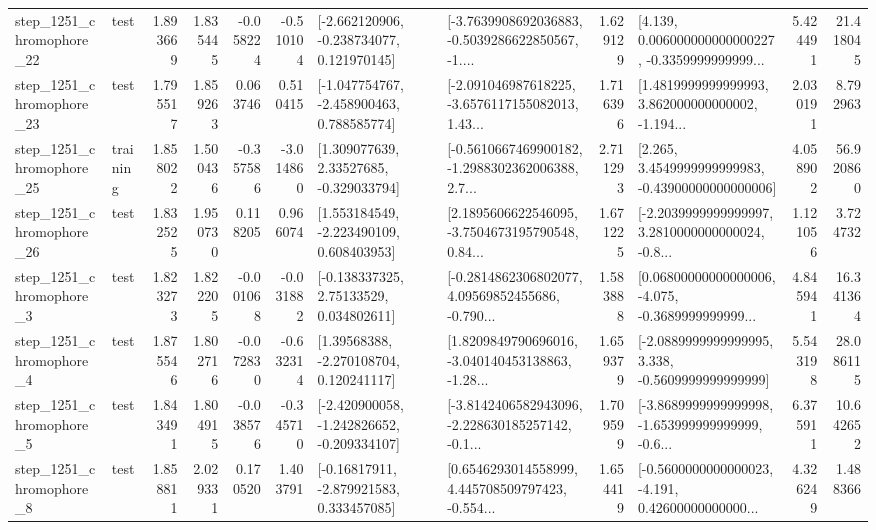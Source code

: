 \begin{tabular}{llrrrrllrlrr}
 step\_1251\_chromophore\_22 &      test &      1.893669 &    1.835445 &     -0.058224 & -0.510104 &   [-2.662120906, -0.238734077, 0.121970145] &  [-3.7639908692036883, -0.5039286622850567, -1.... &       1.629129 &  [4.139, 0.006000000000000227, -0.3359999999999... &            5.424491 &         21.418045 \\
 step\_1251\_chromophore\_23 &      test &      1.795517 &    1.859263 &      0.063746 &  0.510415 &   [-1.047754767, -2.458900463, 0.788585774] &  [-2.091046987618225, -3.6576117155082013, 1.43... &       1.716396 &  [1.4819999999999993, 3.862000000000002, -1.194... &            2.030191 &          8.792963 \\
 step\_1251\_chromophore\_25 &  training &      1.858022 &    1.500436 &     -0.357586 & -3.014860 &     [1.309077639, 2.33527685, -0.329033794] &  [-0.5610667469900182, -1.2988302362006388, 2.7... &       2.711293 &  [2.265, 3.4549999999999983, -0.43900000000000006] &            4.058902 &         56.920860 \\
 step\_1251\_chromophore\_26 &      test &      1.832525 &    1.950730 &      0.118205 &  0.966074 &    [1.553184549, -2.223490109, 0.608403953] &  [2.1895606622546095, -3.7504673195790548, 0.84... &       1.671225 &  [-2.2039999999999997, 3.2810000000000024, -0.8... &            1.121056 &          3.724732 \\
  step\_1251\_chromophore\_3 &      test &      1.823273 &    1.822205 &     -0.001068 & -0.031882 &     [-0.138337325, 2.75133529, 0.034802611] &  [-0.2814862306802077, 4.09569852455686, -0.790... &       1.583888 &  [0.06800000000000006, -4.075, -0.3689999999999... &            4.845941 &         16.341364 \\
  step\_1251\_chromophore\_4 &      test &      1.875546 &    1.802716 &     -0.072830 & -0.632314 &     [1.39568388, -2.270108704, 0.120241117] &  [1.8209849790696016, -3.040140453138863, -1.28... &       1.659379 &  [-2.0889999999999995, 3.338, -0.5609999999999999] &            5.543198 &         28.086115 \\
  step\_1251\_chromophore\_5 &      test &      1.843491 &    1.804915 &     -0.038576 & -0.345710 &  [-2.420900058, -1.242826652, -0.209334107] &  [-3.8142406582943096, -2.228630185257142, -0.1... &       1.709599 &  [-3.8689999999999998, -1.653999999999999, -0.6... &            6.375911 &         10.642652 \\
  step\_1251\_chromophore\_8 &      test &      1.858811 &    2.029331 &      0.170520 &  1.403791 &    [-0.16817911, -2.879921583, 0.333457085] &  [0.6546293014558999, 4.445708509797423, -0.554... &       1.654419 &  [-0.5600000000000023, -4.191, 0.42600000000000... &            4.326249 &          1.488366 \\

\end{tabular}
